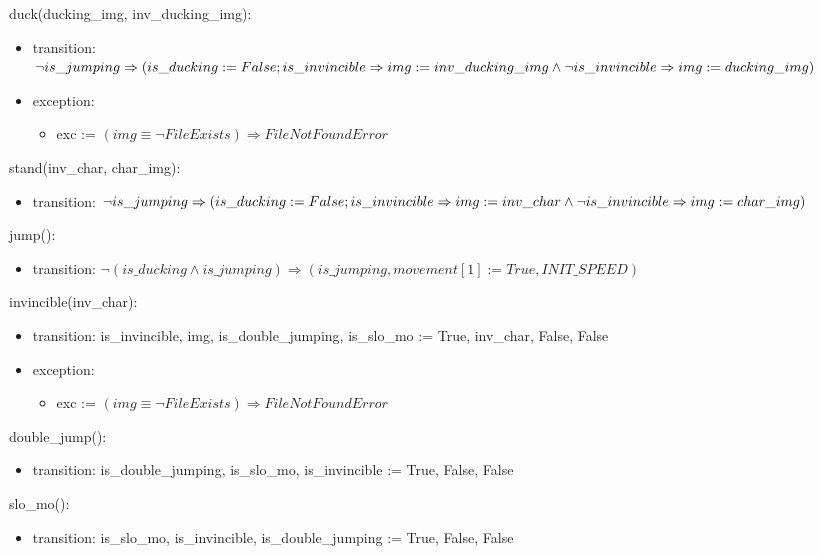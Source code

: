 \documentclass[12pt]{article}
\begin{document}
\noindent duck(ducking\_img, inv\_ducking\_img):
\begin{itemize}
\item transition: $\neg is\_jumping \Rightarrow (is\_ducking := False;\\
is\_invincible \Rightarrow img := inv\_ducking\_img \land \neg is\_invincible \Rightarrow img := ducking\_img)$
\item exception:
    \begin{itemize}[]
        \item   exc := $(img \equiv \neg FileExists) \Rightarrow FileNotFoundError$
    \end{itemize}
\end{itemize}

\noindent stand(inv\_char, char\_img):
\begin{itemize}
\item transition: $\neg is\_jumping \Rightarrow (is\_ducking := False;\\
is\_invincible \Rightarrow img := inv\_char \land \neg is\_invincible \Rightarrow img := char\_img)$
\end{itemize}

\noindent jump():
\begin{itemize}
\item transition: $\neg (is\_ducking \land is\_jumping) \Rightarrow (is\_jumping, movement[1] := True, INIT\_SPEED)$\\
\end{itemize}

\noindent invincible(inv\_char):
\begin{itemize}
\item transition: is\_invincible, img, is\_double\_jumping, is\_slo\_mo := True, inv\_char, False, False\\
\item exception:
    \begin{itemize}[]
        \item   exc := $(img \equiv \neg FileExists) \Rightarrow FileNotFoundError$
    \end{itemize}
\end{itemize}

\noindent double\_jump():
\begin{itemize}
\item transition: is\_double\_jumping, is\_slo\_mo, is\_invincible := True, False, False\\
\end{itemize}

\noindent slo\_mo():
\begin{itemize}
\item transition: is\_slo\_mo, is\_invincible, is\_double\_jumping := True, False, False\\
\end{itemize}
\end{document}
